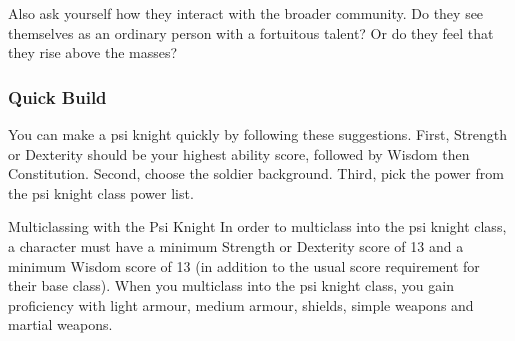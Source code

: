 Also ask yourself how they interact with the broader community.
Do they see themselves as an ordinary person with a fortuitous
talent?
Or do they feel that they rise above the masses?

\subsubsection{Quick Build}
You can make a psi knight quickly by following these suggestions.
First, Strength or Dexterity should be your highest ability score,
followed by Wisdom then Constitution.
Second, choose the soldier background.
Third, pick the  power
from the psi knight class power list.

\begin{DndSidebar}[float=htbp]{Multiclassing with the Psi Knight}
    In order to multiclass into the psi knight class,
    a character must have a minimum Strength or Dexterity score of 13
    and a minimum Wisdom score of 13
    (in addition to the usual score requirement for their base class).
    When you multiclass into the psi knight class,
    you gain proficiency with
    light armour, medium armour, shields, simple weapons
    and martial weapons.
\end{DndSidebar}

